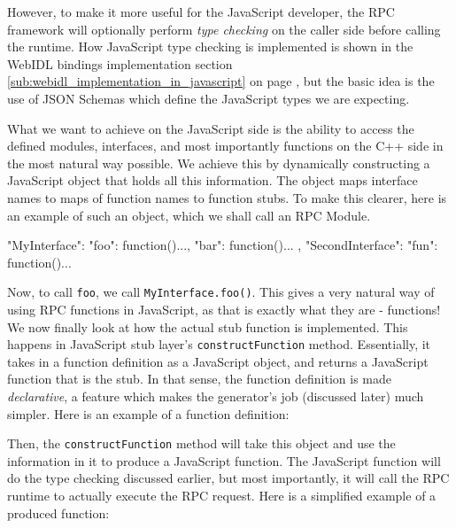 However, to make it more useful for the JavaScript developer, the RPC framework will optionally perform \emph{type checking} on the caller side before calling the runtime. How JavaScript type checking is implemented is shown in the WebIDL bindings implementation section \ref{sub:webidl_implementation_in_javascript} on page \pageref{sub:webidl_implementation_in_javascript}, but the basic idea is the use of JSON Schemas which define the JavaScript types we are expecting.

What we want to achieve on the JavaScript side is the ability to access the defined modules, interfaces, and most importantly functions on the C++ side in the most natural way possible. We achieve this by dynamically constructing a JavaScript object that holds all this information. The object maps interface names to maps of function names to function stubs. To make this clearer, here is an example of such an object, which we shall call an RPC Module.

\begin{code}
{
  "MyInterface": {
    "foo": function(){...},
    "bar": function(){...}
  },
  "SecondInterface": {
    "fun": function(){...}
  }
}
\end{code}

Now, to call \lstinline{foo}, we call \lstinline{MyInterface.foo()}. This gives a very natural way of using RPC functions in JavaScript, as that is exactly what they are - functions! We now finally look at how the actual stub function is implemented. This happens in JavaScript stub layer's \lstinline{constructFunction} method. Essentially, it takes in a function definition as a JavaScript object, and returns a JavaScript function that is the stub. In that sense, the function definition is made \emph{declarative}, a feature which makes the generator's job (discussed later) much simpler. Here is an example of a function definition:


Then, the \lstinline{constructFunction} method will take this object and use the information in it to produce a JavaScript function. The JavaScript function will do the type checking discussed earlier, but most importantly, it will call the RPC runtime to actually execute the RPC request. Here is a simplified example of a produced function:

